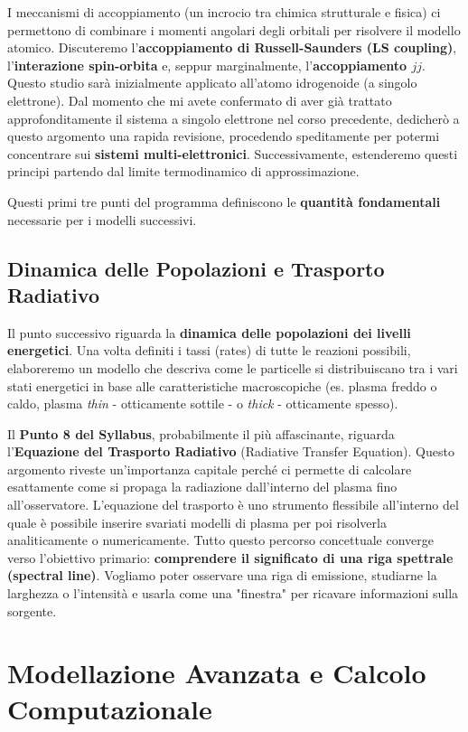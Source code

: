     I meccanismi di accoppiamento (un incrocio tra chimica strutturale e fisica) ci permettono di combinare i momenti angolari degli orbitali per risolvere il modello atomico. Discuteremo l'\textbf{accoppiamento di Russell-Saunders (LS coupling)}, l'\textbf{interazione spin-orbita} e, seppur marginalmente, l'\textbf{accoppiamento $jj$}.
    Questo studio sarà inizialmente applicato all'atomo idrogenoide (a singolo elettrone). Dal momento che mi avete confermato di aver già trattato approfonditamente il sistema a singolo elettrone nel corso precedente, dedicherò a questo argomento una rapida revisione, procedendo speditamente per potermi concentrare sui \textbf{sistemi multi-elettronici}. Successivamente, estenderemo questi principi partendo dal limite termodinamico di approssimazione.
    
    Questi primi tre punti del programma definiscono le \textbf{quantità fondamentali} necessarie per i modelli successivi.
    
    \subsection{Dinamica delle Popolazioni e Trasporto Radiativo}
    
    Il punto successivo riguarda la \textbf{dinamica delle popolazioni dei livelli energetici}. Una volta definiti i tassi (rates) di tutte le reazioni possibili, elaboreremo un modello che descriva come le particelle si distribuiscano tra i vari stati energetici in base alle caratteristiche macroscopiche (es. plasma freddo o caldo, plasma \textit{thin} - otticamente sottile - o \textit{thick} - otticamente spesso).
    
    Il \textbf{Punto 8 del Syllabus}, probabilmente il più affascinante, riguarda l'\textbf{Equazione del Trasporto Radiativo} (Radiative Transfer Equation). Questo argomento riveste un'importanza capitale perché ci permette di calcolare esattamente come si propaga la radiazione dall'interno del plasma fino all'osservatore. L'equazione del trasporto è uno strumento flessibile all'interno del quale è possibile inserire svariati modelli di plasma per poi risolverla analiticamente o numericamente.
    Tutto questo percorso concettuale converge verso l'obiettivo primario: \textbf{comprendere il significato di una riga spettrale (spectral line)}. Vogliamo poter osservare una riga di emissione, studiarne la larghezza o l'intensità e usarla come una "finestra" per ricavare informazioni sulla sorgente.

\section{Modellazione Avanzata e Calcolo Computazionale}


